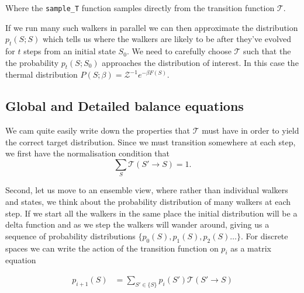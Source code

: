 \begin{Shaded}
\begin{Highlighting}[]
\OperatorTok{=}

 
\OperatorTok{=}
\OperatorTok{=}
\end{Highlighting}
\end{Shaded}

Where the \texttt{sample\_T} function samples directly from the transition function \(\mathcal{T}\).

If we run many such walkers in parallel we can then approximate the distribution \(p_t(S; S)\) which tells us where the walkers are likely to be after they've evolved for \(t\) steps from an initial state \(S_0\). We need to carefully choose \(\mathcal{T}\) such that the the probability \(p_t(S; S_0)\) approaches the distribution of interest. In this case the thermal distribution \(P(S; \beta) = \mathcal{Z}^{-1} e^{-\beta F(S)}\).

\hypertarget{global-and-detailed-balance-equations}{%
\subsection{Global and Detailed balance equations}\label{global-and-detailed-balance-equations}}

We cam quite easily write down the properties that \(\mathcal{T}\) must have in order to yield the correct target distribution. Since we must transition somewhere at each step, we first have the normalisation condition that \[\sum\limits_S \mathcal{T}(S' \rightarrow S) = 1.\]

Second, let us move to an ensemble view, where rather than individual walkers and states, we think about the probability distribution of many walkers at each step. If we start all the walkers in the same place the initial distribution will be a delta function and as we step the walkers will wander around, giving us a sequence of probability distributions \(\{p_0(S), p_1(S), p_2(S)\ldots\}\). For discrete spaces we can write the action of the transition function on \(p_i\) as a matrix equation

\[\begin{aligned}
p_{i+1}(S) &= \sum_{S' \in \{S\}} p_i(S') \mathcal{T}(S' \rightarrow S)
\end{aligned}\]

